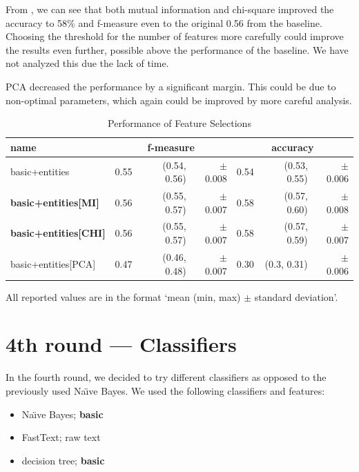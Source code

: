 From , we can see that both mutual information
and chi-square improved the accuracy to 58\% and f-measure even to the original
0.56 from the baseline.
Choosing the threshold for the number of features more carefully could improve the results even further, possible above the performance of the baseline.
We have not analyzed this due the lack of time.

PCA decreased the performance by a significant margin.
This could be due to non-optimal parameters, which
again could be improved by more careful analysis.

\begin{table}[h!]

\centering
\begin{tabular}{lr@{~}r@{~}rr@{~}r@{~}r}
\toprule
\textbf{name}	& \multicolumn{3}{c}{\textbf{f-measure}} & \multicolumn{3}{c}{\textbf{accuracy}} \\

\midrule
basic+entities & 0.55 & (0.54, 0.56) & $\pm$ 0.008 & 0.54 & (0.53, 0.55) & $\pm$ 0.006		\\
\textbf{basic+entities[MI]} & 0.56 & (0.55, 0.57) & $\pm$ 0.007 & 0.58 & (0.57, 0.60) & $\pm$ 0.008 \\
\textbf{basic+entities[CHI]} & 0.56 & (0.55, 0.57) & $\pm$ 0.007 & 0.58 & (0.57, 0.59) & $\pm$ 0.007 \\
basic+entities[PCA] & 0.47 & (0.46, 0.48) & $\pm$ 0.007 & 0.30 & (0.3, 0.31) & $\pm$ 0.006 \\


\bottomrule
\end{tabular}

\caption{Performance of Feature Selections}\label{tab:sel_perf}
All reported values are in the format `mean (min, max) $\pm$ standard deviation'.
\end{table}

\section{4th round --- Classifiers}

In the fourth round, we decided to try different classifiers as opposed to the previously used Na\"{\i}ve Bayes.
We used the following classifiers and features:

\begin{itemize}
\item Na\"{\i}ve Bayes; \textbf{basic}
\item FastText; raw text
\item decision tree; \textbf{basic}
\end{itemize}

